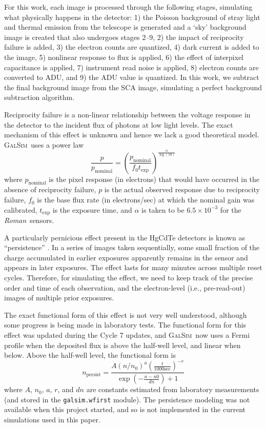 \documentclass[usenatbib]{mnras}
\newcommand{\galsim}{\textsc{GalSim}}
\newcommand{\wfirst}{{\slshape Roman}}
\begin{document}
For this work, each image is processed through the following stages, simulating what physically happens in the detector: 1) the Poisson background of stray light and thermal emission from the telescope is generated and a `sky' background image is created that also undergoes stages 2--9, 2) the impact of reciprocity failure is added, 3) the electron counts are quantized, 4) dark current is added to the image, 5) nonlinear response to flux is applied, 6) the effect of interpixel capacitance is applied, 7) instrument read noise is applied, 8) electron counts are converted to ADU, and 9) the ADU value is quantized. In this work, we subtract the final background image from the SCA image, simulating a perfect background subtraction algorithm.

Reciprocity failure \citep{Biesiadzinski2011} is a non-linear relationship between the voltage response in the detector to the incident flux of photons at low light levels.
The exact mechanism of this effect is unknown and hence we lack a good theoretical model. 
\galsim\ uses a power law
\begin{equation}
\frac{p}{p_\mathrm{nominal}} =
 \left(\frac{p_\mathrm{nominal}}{f_0 t_\mathrm{exp}}\right)^{\frac{\alpha}{\log(10)}}
\end{equation}
where $p_\mathrm{nominal}$ is the pixel response (in electrons) that would have occurred in the absence of reciprocity failure,
$p$ is the actual observed response due to reciprocity failure,
$f_0$ is the base flux rate (in electrons/sec) at which the nominal gain was calibrated, 
$t_\mathrm{exp}$ is the exposure time,
and $\alpha$ is taken to be $6.5 \times 10^{-3}$ for the \wfirst\ sensors.

A particularly pernicious effect present in the HgCdTe detectors is known as ``persistence'' \citep{10.1117/12.789619,2014arXiv1402.4181A,2016SPIE.9915E..0GM}.  
In a series of images taken sequentially, some small fraction of the charge accumulated in earlier exposures apparently remains in the sensor and appears in later exposures.  
The effect lasts for many minutes across multiple reset cycles.  
Therefore, for simulating the effect, we need to keep track of the precise order and time of each observation, and the electron-level (i.e., pre-read-out) images of multiple prior exposures.

The exact functional form of this effect is not very well understood, although some progress is being made in laboratory tests.  
The functional form for this effect was updated during the Cycle 7 updates, and
\galsim\ now uses a Fermi profile when the deposited flux is above the half-well level, and linear when below.
Above the half-well level, the functional form is
\begin{equation}
n_\mathrm{persist} = \frac{A \left(n/n_0\right)^a  \left(\frac{t}{1000 \mathrm{sec}}\right)^{-r}}
{ \exp(- \frac{n-n0}{dn})+ 1}
\end{equation}
where $A$, $n_0$, $a$, $r$, and $dn$ are constants estimated from laboratory measurements (and stored in the \texttt{galsim.wfirst} module).
The persistence modeling was not available when this project started, and so is not implemented in the current simulations used in this paper.
\end{document}

